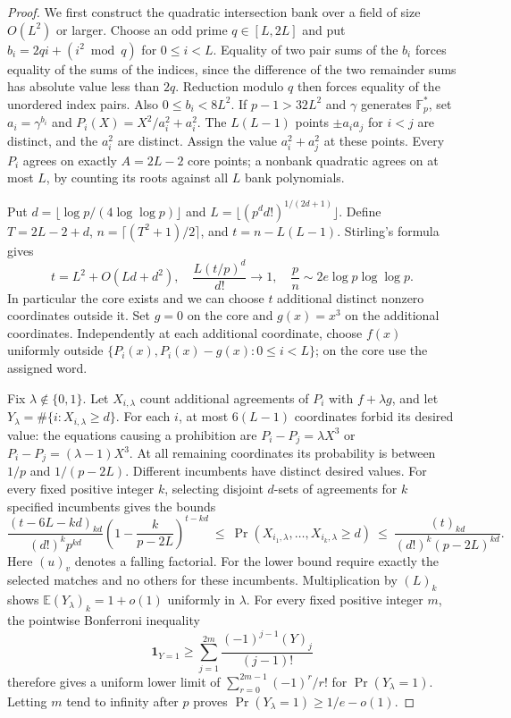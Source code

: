 \begin{proof}
We first construct the quadratic intersection bank over a field of size
$O(L^2)$ or larger. Choose an odd prime $q\in[L,2L]$ and put
$b_i=2qi+(i^2\bmod q)$ for $0\le i<L$.
Equality of two pair sums of the $b_i$ forces equality of the sums of
the indices, since the difference of the two remainder sums has absolute
value less than $2q$. Reduction modulo $q$ then forces equality of the
unordered index pairs. Also $0\le b_i<8L^2$.
If $p-1>32L^2$ and $\gamma$ generates $\mathbb F_p^*$, set
$a_i=\gamma^{b_i}$ and $P_i(X)=X^2/a_i^2+a_i^2$.
The $L(L-1)$ points $\pm a_i a_j$ for $i<j$ are distinct, and the
$a_i^2$ are distinct. Assign the value $a_i^2+a_j^2$ at these points.
Every $P_i$ agrees on exactly $A=2L-2$ core points; a nonbank quadratic
agrees on at most $L$, by counting its roots against all $L$ bank polynomials.

Put $d=\lfloor\log p/(4\log\log p)\rfloor$ and
$L=\lfloor(p^d d!)^{1/(2d+1)}\rfloor$. Define
$T=2L-2+d$, $n=\lceil(T^2+1)/2\rceil$, and
$t=n-L(L-1)$. Stirling's formula gives
\[
 t=L^2+O(Ld+d^2),\quad
 \frac{L(t/p)^d}{d!}\longrightarrow1,\quad
 \frac pn\sim2e\log p\log\log p.
\]
In particular the core exists and we can choose $t$ additional distinct
nonzero coordinates outside it. Set $g=0$ on the core and $g(x)=x^3$
on the additional coordinates. Independently at each additional coordinate,
choose $f(x)$ uniformly outside
$\{P_i(x),P_i(x)-g(x):0\le i<L\}$; on the core use the assigned word.

Fix $\lambda\notin\{0,1\}$. Let $X_{i,\lambda}$ count additional
agreements of $P_i$ with $f+\lambda g$, and let
$Y_\lambda=\#\{i:X_{i,\lambda}\ge d\}$.
For each $i$, at most $6(L-1)$ coordinates forbid its desired value:
the equations causing a prohibition are
$P_i-P_j=\lambda X^3$ or $P_i-P_j=(\lambda-1)X^3$.
At all remaining coordinates its probability is between $1/p$ and
$1/(p-2L)$. Different incumbents have distinct desired values.
For every fixed positive integer $k$, selecting disjoint $d$-sets of
agreements for $k$ specified incumbents gives the bounds
\[
 \frac{(t-6L-kd)_{kd}}{(d!)^k p^{kd}}
 \left(1-\frac{k}{p-2L}\right)^{t-kd}
 \ \le\ \Pr(X_{i_1,\lambda},\ldots,X_{i_k,\lambda}\ge d)
 \ \le\ \frac{(t)_{kd}}{(d!)^k(p-2L)^{kd}}.
\]
Here $(u)_v$ denotes a falling factorial. For the lower bound require
exactly the selected matches and no others for these incumbents.
Multiplication by $(L)_k$ shows
$\mathbb E(Y_\lambda)_k=1+o(1)$ uniformly in $\lambda$.
For every fixed positive integer $m$, the pointwise Bonferroni inequality
\[
 \mathbf1_{Y=1}\ge
 \sum_{j=1}^{2m}\frac{(-1)^{j-1}(Y)_j}{(j-1)!}
\]
therefore gives a uniform lower limit of
$\sum_{r=0}^{2m-1}(-1)^r/r!$ for $\Pr(Y_\lambda=1)$.
Letting $m$ tend to infinity after $p$ proves
$\Pr(Y_\lambda=1)\ge1/e-o(1)$.


\end{proof}
